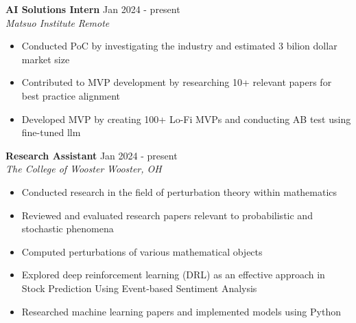 \documentclass[a4paper,12pt]{article}
\begin{document}
\textbf{AI Solutions Intern} \hfill \textnormal{Jan 2024 - present}\\
\textit{Matsuo Institute} \hfill \textit{Remote}
\begin{itemize}
    \item Conducted PoC by investigating the industry and estimated 3 bilion dollar market size
    \item Contributed to MVP development by researching 10+ relevant papers for best practice alignment
    \item Developed MVP by creating 100+ Lo-Fi MVPs and conducting AB test using fine-tuned llm
\end{itemize}
\textbf{Research Assistant} \hfill \textnormal{Jan 2024 - present}\\
\textit{The College of Wooster} \hfill \textit{Wooster, OH}
\begin{itemize}
    \item Conducted research in the field of perturbation theory within mathematics
    \item Reviewed and evaluated research papers relevant to probabilistic and stochastic phenomena
    \item Computed perturbations of various mathematical objects
    \item Explored deep reinforcement learning (DRL) as an effective approach in Stock Prediction Using Event-based Sentiment Analysis
    \item Researched machine learning papers and implemented models using Python
\end{itemize}
\end{document}
